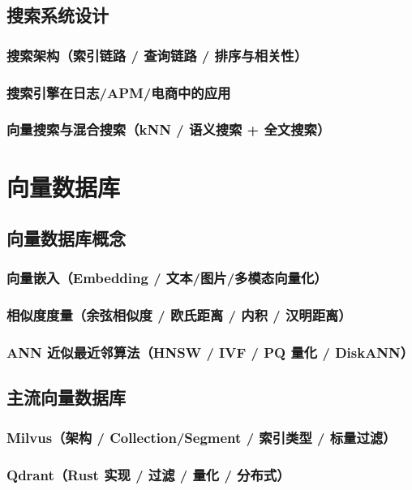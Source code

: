 \documentclass[12pt,UTF8]{ctexbook}
\begin{document}
  \section{搜索系统设计}
    \subsection{搜索架构（索引链路 / 查询链路 / 排序与相关性）}
    \subsection{搜索引擎在日志/APM/电商中的应用}
    \subsection{向量搜索与混合搜索（kNN / 语义搜索 + 全文搜索）}


\chapter{向量数据库}
\label{chap:vector-database}

  \section{向量数据库概念}
    \subsection{向量嵌入（Embedding / 文本/图片/多模态向量化）}
    \subsection{相似度度量（余弦相似度 / 欧氏距离 / 内积 / 汉明距离）}
    \subsection{ANN 近似最近邻算法（HNSW / IVF / PQ 量化 / DiskANN）}

  \section{主流向量数据库}
    \subsection{Milvus（架构 / Collection/Segment / 索引类型 / 标量过滤）}
    \subsection{Qdrant（Rust 实现 / 过滤 / 量化 / 分布式）}
\end{document}

